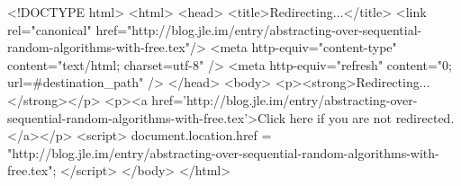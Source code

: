 <!DOCTYPE html>
<html>
<head>
<title>Redirecting...</title>
<link rel="canonical" href="http://blog.jle.im/entry/abstracting-over-sequential-random-algorithms-with-free.tex"/>
<meta http-equiv="content-type" content="text/html; charset=utf-8" />
<meta http-equiv="refresh" content="0; url=#{destination_path}" />
</head>
<body>
  <p><strong>Redirecting...</strong></p>
  <p><a href='http://blog.jle.im/entry/abstracting-over-sequential-random-algorithms-with-free.tex'>Click here if you are not redirected.</a></p>
  <script>
    document.location.href = "http://blog.jle.im/entry/abstracting-over-sequential-random-algorithms-with-free.tex";
  </script>
</body>
</html>
